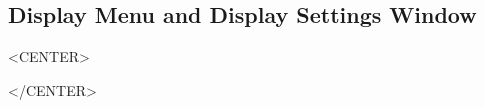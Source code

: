 %
%
%


\subsection{Display Menu and Display Settings Window}
\label{ug:ui:window:display}

\begin{rawhtml}
<CENTER>
\end{rawhtml}
\begin{rawhtml}
</CENTER>
\end{rawhtml}

